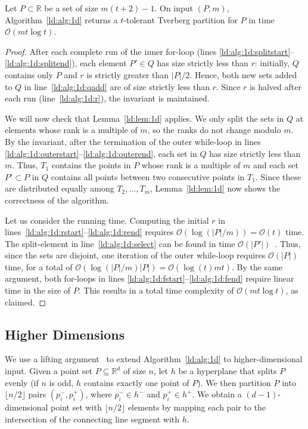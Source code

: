 \documentclass[oribibl,envcountsame,envcountsect]{llncs}
\newcommand{\bo}[1]{\mathcal{O}(#1)}
\newcommand{\real}{\mathbb{R}}
\begin{document}
\begin{theorem}
  Let $P\subset\real$ be a set of size $m(t+2)-1$. On input $(P,m)$,
  Algorithm~\ref{ld:alg:1d} returns a $t$-tolerant Tverberg partition for $P$ in
  time $\bo{mt \log t}$.
  \label{ld:thm:bound}
\end{theorem}
\begin{proof}
  After each complete run of the inner
  for-loop (lines \ref{ld:alg:1d:splitstart}--\ref{ld:alg:1d:splitend}),
  each element $P'\in Q$ has size strictly less than
  $r$:
  initially, $Q$ contains only $P$ and $r$ is strictly greater than $|P|/2$.
  Hence, both new sets added to $Q$ in line~\ref{ld:alg:1d:qadd}
  are of size strictly less than $r$.
  Since $r$ is halved after each run (line~\ref{ld:alg:1d:r}), the invariant is maintained.

  We will now check that Lemma~\ref{ld:lem:1d} applies. We only split the sets
  in $Q$ at elements whose rank is a multiple of $m$, so the ranks do not change
  modulo $m$. By the invariant, after the termination of the outer while-loop
  in lines \ref{ld:alg:1d:outerstart}--\ref{ld:alg:1d:outerend}, each set in $Q$
  has size strictly less than $m$. Thus, $T_1$ contains the
  points in $P$ whose rank is a multiple of $m$ and
  each set $P'\subset P$ in $Q$ contains all points between two consecutive
  points in $T_1$. Since these are distributed equally among
  $T_2,\ldots,T_m$, Lemma~\ref{ld:lem:1d} now shows the correctness of the
  algorithm.

  Let us consider the running time. Computing the initial $r$ in
  lines~\ref{ld:alg:1d:rstart}--\ref{ld:alg:1d:rend} requires
  $\bo{\log(|P|/m)}=\bo{t}$ time. The split-element in
  line~\ref{ld:alg:1d:select} can be found in time
  $\bo{|P'|}$~\cite{Cormen2009}. Thus, since the sets are disjoint,
  one iteration of the outer while-loop requires $\bo{|P|}$ time, for a total of
  $\bo{\log(|P|/m) |P|}=\bo{\log(t) mt}$. By the same argument, both for-loops
  in lines \ref{ld:alg:1d:fstart}--\ref{ld:alg:1d:fend} require linear time in
  the size of $P$. This results in a total time complexity of $\bo{mt \log t}$,
  as claimed.
\end{proof}

\subsection{Higher Dimensions}
We use a lifting argument~\cite{Mulzer2013} to extend Algorithm~\ref{ld:alg:1d} to
higher-dimensional input.
Given a point set $P\subseteq \real^{d}$ of size $n$, let $h$ be a hyperplane that
splits $P$ evenly (if $n$ is odd, $h$ contains exactly one point of $P$). We
then partition $P$ into $\lfloor n/2 \rfloor$ pairs $(p_i^-,p_i^+)$, where
$p_i^-\in h^-$ and $p_i^+\in h^+$. We obtain a $(d-1)$-dimensional point set
with $\lfloor n/2 \rfloor$ elements by mapping each pair to the intersection of
the connecting line segment with $h$.
\end{document}

